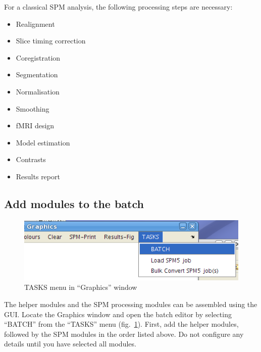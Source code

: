 For a classical SPM analysis, the following processing steps are necessary:

\begin{itemize}
\item Realignment
\item Slice timing correction
\item Coregistration
\item Segmentation
\item Normalisation
\item Smoothing
\item fMRI design
\item Model estimation
\item Contrasts
\item Results report
\end{itemize}

\subsection{Add modules to the batch}

\begin{figure}[htbp]
  \centering
  \includegraphics{batch/tasks}
  \caption{TASKS menu in ``Graphics'' window}
  \label{fig:tasks}
\end{figure}
The helper modules and the SPM processing modules can be assembled using the
GUI. Locate the Graphics window and open the batch editor by selecting
``BATCH'' from the ``TASKS'' menu (fig.~\ref{fig:tasks}). First, add the
helper modules, followed by the SPM modules in the order listed above. Do not
configure any details until you have selected all modules.

